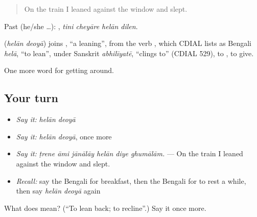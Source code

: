 \begin{quote}
On the train I leaned against the window and slept.
\end{quote}

Past (he/she …):    , \emph{tini cheyāre helān dilen}.

\begin{cousinweb}
\textbf{ } (\emph{helān deoyā}) joins , \textquotedblleft{}a leaning\textquotedblright{}, from the verb , which CDIAL lists as Bengali \emph{helā}, \textquotedblleft{}to lean\textquotedblright{}, under Sanskrit \emph{abhilīyatē}, \textquotedblleft{}clings to\textquotedblright{} (CDIAL 529), to , to give.
\end{cousinweb}

\begin{grammarlens}[title={What you've built}]
One more word for getting around.
\end{grammarlens}

\subsection*{Your turn}
\begin{itemize}
\raggedright
  \item \emph{Say it:} \emph{helān deoyā}
  \item \emph{Say it:} \emph{helān deoyā}, once more
  \item \emph{Say it:} \emph{ṭrene āmi jānālāy helān diye ghumālām.} — On the train I leaned against the window and slept.
  \item \emph{Recall:} say the Bengali for breakfast, then the Bengali for to rest a while, then say \emph{helān deoyā} again
\end{itemize}

\begin{tcolorbox}[breakable,colback=teal!4,colframe=teal!35!black,title={Before you move on}]
What does   mean? (\textquotedblleft{}To lean back; to recline\textquotedblright{}.) Say it once more.
\end{tcolorbox}
